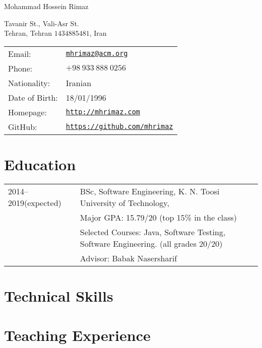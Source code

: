 \documentclass[letterpaper]{article}
\def\name{Mohammad Hossein Rimaz}
\begin{document}
{\huge \name}


\vspace{0.25in}

\begin{minipage}{0.45\linewidth}
  Tavanir St., Vali-Asr St. \\
  Tehran, Tehran $1434885481$, Iran
\end{minipage}
\begin{minipage}{0.45\linewidth}
  \begin{tabular}{ll}
    Email: & \href{mailto:mhrimaz@acm.org}{\tt mhrimaz@acm.org} \\
    Phone: & $+98~933~888~0256$ \\
    Nationality: & Iranian \\
    Date of Birth: & 18/01/1996  \\
    Homepage: & \href{http://mhrimaz.com}{\tt http://mhrimaz.com} \\
    GitHub: & \href{https://mhrimaz.github.io}{\tt https://github.com/mhrimaz} 
  \end{tabular}
\end{minipage}


\section*{Education}

{\renewcommand{\arraystretch}{1.2}
\begin{tabular}{l l}
2014--2019(expected) & BSc, Software Engineering, K. N. Toosi University of Technology,\\
 & Major GPA: 15.79/20 (top 15\% in the class) \\
 & Selected Courses: Java, Software Testing, Software Engineering. (all grades 20/20)\\
 & Advisor: Babak Nasersharif
\end{tabular}
}

\section*{Technical Skills}



\section*{Teaching Experience}
\end{document}

